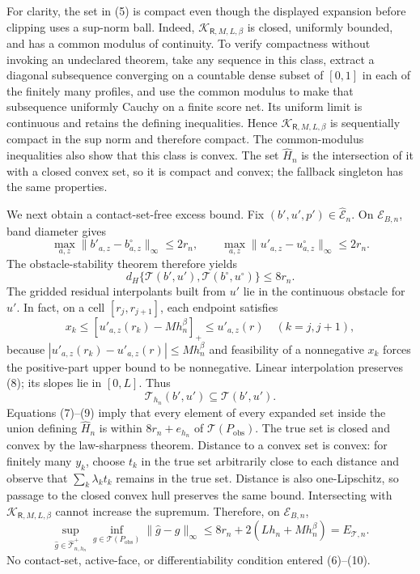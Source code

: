 For clarity, the set in (5) is compact even though the displayed expansion before clipping uses a sup-norm ball.  Indeed, \(\mathcal K_{\mathsf R,M,L,\beta}\) is closed, uniformly bounded, and has a common modulus of continuity.  To verify compactness without invoking an undeclared theorem, take any sequence in this class, extract a diagonal subsequence converging on a countable dense subset of \([0,1]\) in each of the finitely many profiles, and use the common modulus to make that subsequence uniformly Cauchy on a finite score net.  Its uniform limit is continuous and retains the defining inequalities.  Hence \(\mathcal K_{\mathsf R,M,L,\beta}\) is sequentially compact in the sup norm and therefore compact.  The common-modulus inequalities also show that this class is convex.  The set \(\widehat H_n\) is the intersection of it with a closed convex set, so it is compact and convex; the fallback singleton has the same properties.

We next obtain a contact-set-free excess bound.  Fix \((b',u',p')\in\widehat{\mathcal E}_n\).  On \(\mathcal E_{B,n}\), band diameter gives
\[
\max_{a,z}\|b'_{a,z}-b^\circ_{a,z}\|_\infty\leq2r_n,
\qquad
\max_{a,z}\|u'_{a,z}-u^\circ_{a,z}\|_\infty\leq2r_n.
\tag{6}
\]
The obstacle-stability theorem therefore yields
\[
d_H\{\mathcal T(b',u'),\mathcal T(b^\circ,u^\circ)\}\leq8r_n.
\tag{7}
\]
The gridded residual interpolants built from \(u'\) lie in the continuous obstacle for \(u'\).  In fact, on a cell \([r_j,r_{j+1}]\), each endpoint satisfies
\[
x_k\leq[u'_{a,z}(r_k)-Mh_n^\beta]_+\leq u'_{a,z}(r)
\quad(k=j,j+1),
\tag{8}
\]
because \(|u'_{a,z}(r_k)-u'_{a,z}(r)|\leq Mh_n^\beta\) and feasibility of a nonnegative \(x_k\) forces the positive-part upper bound to be nonnegative.  Linear interpolation preserves (8); its slopes lie in \([0,L]\).  Thus
\[
\mathcal T_{h_n}(b',u')\subseteq\mathcal T(b',u').
\tag{9}
\]
Equations (7)--(9) imply that every element of every expanded set inside the union defining \(\widehat H_n\) is within \(8r_n+e_{h_n}\) of \(\mathcal T(P_{\mathrm{obs}})\).  The true set is closed and convex by the law-sharpness theorem.  Distance to a convex set is convex: for finitely many \(y_k\), choose \(t_k\) in the true set arbitrarily close to each distance and observe that \(\sum_k\lambda_kt_k\) remains in the true set.  Distance is also one-Lipschitz, so passage to the closed convex hull preserves the same bound.  Intersecting with \(\mathcal K_{\mathsf R,M,L,\beta}\) cannot increase the supremum.  Therefore, on \(\mathcal E_{B,n}\),
\[
\sup_{\widehat g\in\widehat{\mathcal T}_{n,h_n}^{+}}
\inf_{g\in\mathcal T(P_{\mathrm{obs}})}\|\widehat g-g\|_\infty
\leq8r_n+2(Lh_n+Mh_n^\beta)=E_{\mathcal T,n}.
\tag{10}
\]
No contact-set, active-face, or differentiability condition entered (6)--(10).

